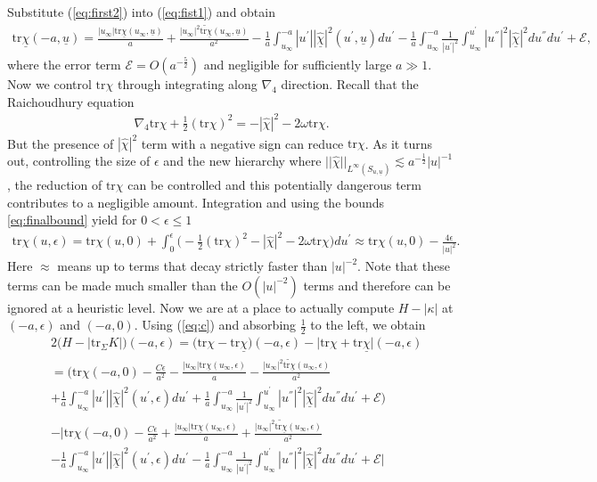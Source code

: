 \documentclass{amsart}
\newcommand{\chihat}{\hat{\chi}}
\newcommand{\chibar}{\underline{\chi}}
\newcommand{\chibarhat}{\underline{\hat{\chi}}}
\newcommand{\ubar}{\underline{u}}
\newcommand{\tr}{\mbox{tr}}
\begin{document}
Substitute (\ref{eq:first2}) into (\ref{eq:fist1}) and obtain 
\begin{align}
 \tr\chibar(-a,\ubar)=\frac{|u_{\infty}|\tr\chibar(u_{\infty},\ubar)}{a}+\frac{|u_{\infty}|^{2}\widetilde{\tr\chibar}(u_{\infty},\ubar)}{a^{2}}-\frac{1}{a}\int_{u_{\infty}}^{-a}|u^{'}||\chibarhat|^{2}(u^{'},\ubar)du^{'}-\frac{1}{a}\int_{u_{\infty}}^{-a}\frac{1}{|u^{'}|^{2}}\int_{u_{\infty}}^{u^{'}}|u^{''}|^{2}|\chibarhat|^{2}du^{''}du^{'}+\mathscr{E},
\end{align}
where the error term $\mathscr{E}=O(a^{-\frac{5}{2}})$ and negligible for sufficiently large $a\gg 1$.
Now we control $\tr\chi$ through integrating along $\nabla_{4}$ direction. Recall that the Raichoudhury equation 
\begin{align}
\nabla_{4}\tr\chi+\frac{1}{2}(\tr\chi)^{2}=-|\chihat|^{2}-2\omega\tr\chi.    
\end{align}
But the presence of $|\chihat|^{2}$ term with a negative sign can reduce $\tr\chi$. As it turns out, controlling the size of $\epsilon$ and the new hierarchy where $||\chihat||_{L^{\infty}(S_{u,\ubar})}\lesssim a^{-\frac{1}{2}}|u|^{-1}$, the reduction of $\tr\chi$ can be controlled and this potentially dangerous term contributes to a negligible amount.    
Integration and using the bounds \ref{eq:finalbound} yield for $0<\epsilon\leq 1$
\begin{align}
  \tr\chi(u,\epsilon)=\tr\chi(u,0)+\int_{0}^{\epsilon}\bigg(-\frac{1}{2}(\tr\chi)^{2}-|\chihat|^{2}-2\omega\tr\chi\bigg)du^{'}\approx \tr\chi(u,0)-\frac{4\epsilon}{|u|^{2}}.  
\end{align}
Here $\approx$ means up to terms that decay strictly faster than $|u|^{-2}$. Note that these terms can be made much smaller than the $O(|u|^{-2})$ terms and therefore can be ignored at a heuristic level.
Now we are at a place to actually compute $H-|\kappa|$ at $(-a,\epsilon)$ and $(-a,0)$. Using (\ref{eq:c}) and absorbing $\frac{1}{2}$ to the left, we obtain  
\begin{align}
&2\bigg(H-|\tr_{\Sigma}K|\bigg)(-a,\epsilon)=\bigg(\tr\chi-\tr\chibar\bigg)(-a,\epsilon)-\bigg|\tr\chi+\tr\chibar\bigg|(-a,\epsilon)\\\nonumber
&=\bigg(\tr\chi(-a,0)-\frac{C\epsilon}{a^{2}}-\frac{|u_{\infty}|\tr\chibar(u_{\infty},\epsilon)}{a}-\frac{|u_{\infty}|^{2}\widetilde{\tr\chibar}(u_{\infty},\epsilon)}{a^{2}}\\\nonumber
&+\frac{1}{a}\int_{u_{\infty}}^{-a}|u^{'}||\chibarhat|^{2}(u^{'},\epsilon)du^{'}+\frac{1}{a}\int_{u_{\infty}}^{-a}\frac{1}{|u^{'}|^{2}}\int_{u_{\infty}}^{u^{'}}|u^{''}|^{2}|\chibarhat|^{2}du^{''}du^{'}+\mathscr{E}\bigg)\\\nonumber
&-\bigg|\tr\chi(-a,0)-\frac{C\epsilon}{a^{2}}+\frac{|u_{\infty}|\tr\chibar(u_{\infty},\epsilon)}{a}+\frac{|u_{\infty}|^{2}\widetilde{\tr\chibar}(u_{\infty},\epsilon)}{a^{2}}\\\nonumber
&-\frac{1}{a}\int_{u_{\infty}}^{-a}|u^{'}||\chibarhat|^{2}(u^{'},\epsilon)du^{'}-\frac{1}{a}\int_{u_{\infty}}^{-a}\frac{1}{|u^{'}|^{2}}\int_{u_{\infty}}^{u^{'}}|u^{''}|^{2}|\chibarhat|^{2}du^{''}du^{'}+\mathscr{E}\bigg|
\end{align}
\end{document}
